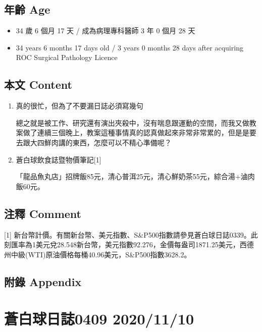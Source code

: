 \documentclass[
]{article}
\providecommand{\tightlist}{%
  \setlength{\itemsep}{0pt}\setlength{\parskip}{0pt}}
\begin{document}
\hypertarget{ux5e74ux9f61-age-6}{%
\subsection{年齡 Age}\label{ux5e74ux9f61-age-6}}

\begin{itemize}
\tightlist
\item
  34 歲 6 個月 17 天 / 成為病理專科醫師 3 年 0 個月 28 天
\item
  34 years 6 months 17 days old / 3 years 0 months 28 days after
  acquiring ROC Surgical Pathology Licence
\end{itemize}

\hypertarget{ux672cux6587-content-6}{%
\subsection{本文 Content}\label{ux672cux6587-content-6}}

\begin{enumerate}
\def\labelenumi{\arabic{enumi}.}
\item
  真的很忙，但為了不要漏日誌必須寫幾句

  總之就是被工作、研究還有演出夾殺中，沒有喘息跟運動的空間，而我又做教案做了連續三個晚上，教案這種事情真的認真做起來非常非常累的，但是是要去跟大四鮮肉講的東西，怎麼可以不精心準備呢？
\item
  蒼白球飲食誌暨物價筆記{[}1{]}

  「龍品魚丸店」招牌飯85元，清心普洱25元，清心鮮奶茶55元，綜合湯+滷肉飯60元。
\end{enumerate}

\hypertarget{ux6ce8ux91cb-comment-6}{%
\subsection{注釋 Comment}\label{ux6ce8ux91cb-comment-6}}

{[}1{]}
新台幣計價。有關新台幣、美元指數、S\&P500指數請參見蒼白球日誌0339。此刻匯率為1美元兌28.548新台幣，美元指數92.276，金價每盎司1871.25美元，西德州中級(WTI)原油價格每桶40.96美元，S\&P500指數3628.2。

\hypertarget{ux9644ux9304-appendix-6}{%
\subsection{附錄 Appendix}\label{ux9644ux9304-appendix-6}}

\hypertarget{ux84bcux767dux7403ux65e5ux8a8c0409-20201110}{%
\section{蒼白球日誌0409
2020/11/10}\label{ux84bcux767dux7403ux65e5ux8a8c0409-20201110}}
\end{document}
